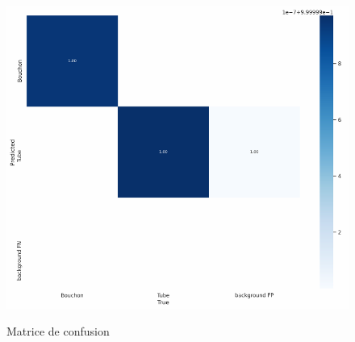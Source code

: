             \begin{figure}[H]
                \centering
            	\begin{frame}{\includegraphics[width=1\textwidth]{image/matriceConfusion.png}}
            	\end{frame}
            	\caption{\label{fig:matrConfu}Matrice de confusion}
            \end{figure}
            
